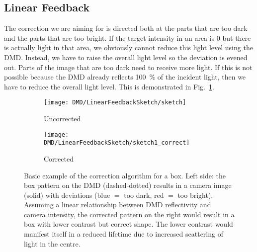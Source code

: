 \subsection{Linear Feedback}
The correction we are aiming for is directed both at the parts that are too dark and the parts that are too bright. If the target intensity in an area is 0 but there is actually light in that area, we obviously cannot reduce this light level using the DMD. Instead, we have to raise the overall light level so the deviation is evened out. Parts of the image that are too dark need to receive more light. If this is not possible because the DMD already reflects \SI{100}{\percent} of the incident light, then we have to reduce the overall light level. This is demonstrated in Fig.~\ref{fig:linear_feedback_scheme}.
\begin{figure}[hbp]
    \centering
    \begin{subfigure}[c]{0.52\textwidth}
        \centering
        \texttt{[image: DMD/LinearFeedbackSketch/sketch]}
        \caption{Uncorrected}
    \end{subfigure}
    \begin{subfigure}[c]{0.47\textwidth}
        \centering
        \texttt{[image: DMD/LinearFeedbackSketch/sketch1\_correct]}
        \caption{Corrected}
    \end{subfigure}
    \caption[Basic example of the correction algorithm for a box]{Basic example of the correction algorithm for a box. Left side: the box pattern on the DMD (dashed-dotted) results in a camera image (solid) with deviations (blue $=$ too dark, red $=$ too bright). Assuming a linear relationship between DMD reflectivity and camera intensity, the corrected pattern on the right would result in a box with lower contrast but correct shape. The lower contrast would manifest itself in a reduced lifetime due to increased scattering of light in the centre.}
    \label{fig:linear_feedback_scheme}
\end{figure}

